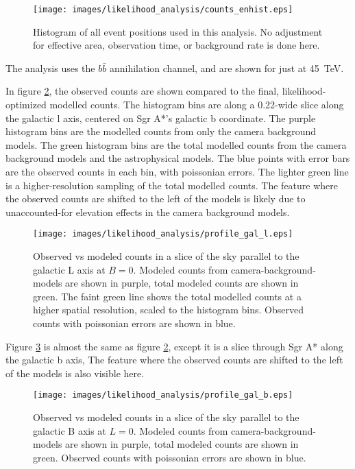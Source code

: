   \begin{figure}[ht]
    \centering
    \texttt{[image: images/likelihood\_analysis/counts\_enhist.eps]}
    \caption[Galactic Center Counts Energy Histogram]{
      Histogram of all event positions used in this analysis.
      No adjustment for effective area, observation time, or background rate is done here.
    }
    \label{fig:gc_counts_enhist}
  \end{figure}

  The analysis uses the $b\bar{b}$ annihilation channel, and are shown for just at \SI{45}{TeV}.

  In figure \ref{fig:gc_profile_gal_l}, the observed counts are shown compared to the final, likelihood-optimized modelled counts.
  The histogram bins are along a 0.22\degree-wide slice along the galactic l axis, centered on Sgr A*'s galactic b coordinate.
  The purple histogram bins are the modelled counts from only the camera background models.
  The green histogram bins are the total modelled counts from the camera background models and the astrophysical models.
  The blue points with error bars are the observed counts in each bin, with poissonian errors.
  The lighter green line is a higher-resolution sampling of the total modelled counts.
  The feature where the observed counts are shifted to the left of the models is likely due to unaccounted-for elevation effects in the camera background models.
  
  \begin{figure}[h]
    \centering
    \texttt{[image: images/likelihood\_analysis/profile\_gal\_l.eps]}
    \caption[Galactic Center Profile vs Galactic L]{
      Observed vs modeled counts in a slice of the sky parallel to the galactic L axis at $B=0$.
      Modeled counts from camera-background-models are shown in purple, total modeled counts are shown in green.
      The faint green line shows the total modelled counts at a higher spatial resolution, scaled to the histogram bins.
      Observed counts with poissonian errors are shown in blue.
    }
    \label{fig:gc_profile_gal_l}
  \end{figure}

  Figure \ref{fig:gc_profile_gal_b} is almost the same as figure \ref{fig:gc_profile_gal_l}, except it is a slice through Sgr A* along the galactic b axis,
  The feature where the observed counts are shifted to the left of the models is also visible here.

  \begin{figure}[h]
    \centering
    \texttt{[image: images/likelihood\_analysis/profile\_gal\_b.eps]}
    \caption[Galactic Center Profile vs Galactic B]{
      Observed vs modeled counts in a slice of the sky parallel to the galactic B axis at $L=0$.
      Modeled counts from camera-background-models are shown in purple, total modeled counts are shown in green.
      Observed counts with poissonian errors are shown in blue.
    }
    \label{fig:gc_profile_gal_b}
  \end{figure}

